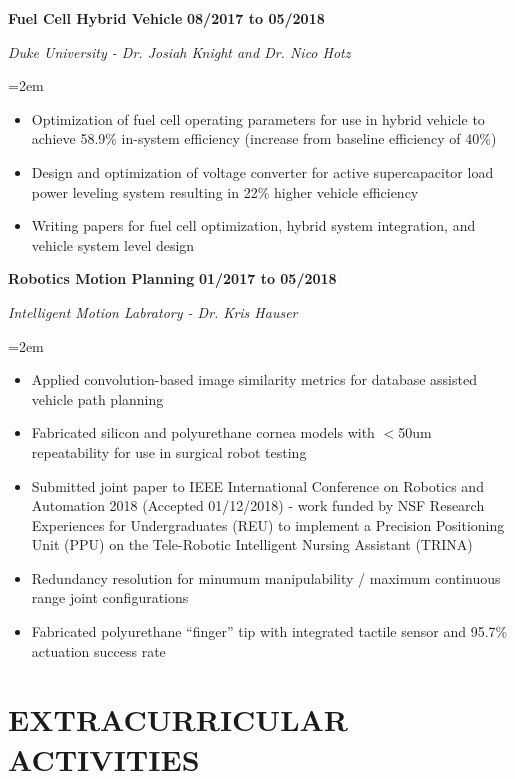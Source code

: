 \documentclass[paper=letter,fontsize=11pt]{scrartcl} %
\newcommand{\sepspace}{\vspace*{1em}}		%
\newcommand{\NewPart}[2]{\section*{\uppercase{#1} #2}}
\newcommand{\EducationEntry}[4]{
		\noindent \textbf{#1} \hfill      %
		\colorbox{White}{%
			\bf 
			\parbox{10em}{%
			\hfill\color{Black}#2}} \par  %
		\noindent \textit{#3} \par        %
		\noindent\hangindent=2em\hangafter=0 \small #4 %
		\normalsize \par}
\newcommand{\WorkEntry}[4]{				  %
		\noindent \textbf{#1} \hfill      %
		\colorbox{White}{\bf \color{Black}#2} \par  %
		\noindent \textit{#3} \par              %
		\noindent\hangindent=2em\hangafter=0 \small #4 %
		\normalsize \par}
\begin{document}
\WorkEntry{Fuel Cell Hybrid Vehicle}{08/2017 to 05/2018}{Duke University - Dr. Josiah Knight and Dr. Nico Hotz}{
	\begin{itemize}
		\item Optimization of fuel cell operating parameters for use in hybrid vehicle to achieve 58.9\% in-system efficiency (increase from baseline efficiency of 40\%)
		\item Design and optimization of voltage converter for active supercapacitor load power leveling system resulting in 22\% higher vehicle efficiency
		\item Writing papers for fuel cell optimization, hybrid system integration, and vehicle system level design
	\end{itemize}
}
\sepspace

\WorkEntry{Robotics Motion Planning}{01/2017 to 05/2018}{Intelligent Motion Labratory - Dr. Kris Hauser}{
	\begin{itemize}
		\item Applied convolution-based image similarity metrics for database assisted vehicle path planning
		\item Fabricated silicon and polyurethane cornea models with $<$50um repeatability for use in surgical robot testing
		\item Submitted joint paper to IEEE International Conference on Robotics and Automation 2018
(Accepted 01/12/2018) - work funded by NSF Research Experiences for Undergraduates (REU) to implement a Precision Positioning Unit (PPU) on the Tele-Robotic Intelligent Nursing Assistant (TRINA)
		\item Redundancy resolution for minumum manipulability / maximum continuous range joint configurations
		\item Fabricated polyurethane “finger” tip with integrated tactile sensor and 95.7\% actuation success rate
	\end{itemize}
}

\NewPart{Extracurricular Activities}{}
\end{document}
